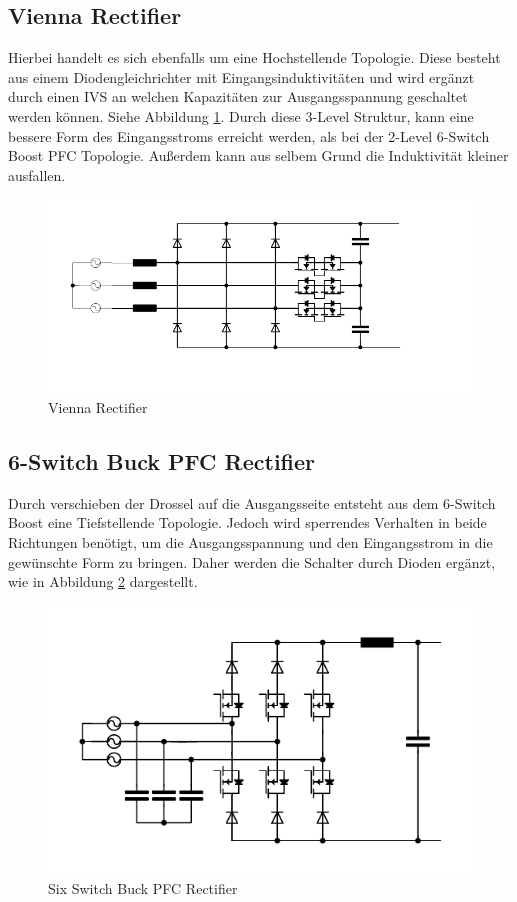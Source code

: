 	\subsection{Vienna Rectifier}
		Hierbei handelt es sich ebenfalls um eine Hochstellende Topologie. Diese besteht aus einem Diodengleichrichter mit Eingangsinduktivitäten und wird ergänzt durch einen \gls{IVS} an welchen Kapazitäten zur Ausgangsspannung geschaltet werden können. Siehe Abbildung \ref{fig:vienna}. Durch diese 3-Level Struktur, kann eine bessere Form des Eingangsstroms erreicht werden, als bei der 2-Level 6-Switch Boost PFC Topologie. Außerdem kann aus selbem Grund die Induktivität kleiner ausfallen.
		\begin{figure}
			\centering
			\includegraphics[width=0.7\linewidth]{content/Grafiken/Vienna}
			\caption{Vienna Rectifier}
			\label{fig:vienna}
		\end{figure}
		
	\subsection{6-Switch Buck PFC Rectifier}
		Durch verschieben der Drossel auf die Ausgangsseite entsteht aus dem 6-Switch Boost eine Tiefstellende Topologie. Jedoch wird sperrendes Verhalten in beide Richtungen benötigt, um die Ausgangsspannung und den Eingangsstrom in die gewünschte Form zu bringen. Daher werden die Schalter durch Dioden ergänzt, wie in Abbildung \ref{fig:sixswitchbuck} dargestellt. 
		
		\begin{figure}
			\centering
			\includegraphics[width=0.7\linewidth]{content/Grafiken/SixSwitchBuck}
			\caption{Six Switch Buck PFC Rectifier}
			\label{fig:sixswitchbuck}
		\end{figure}
	
